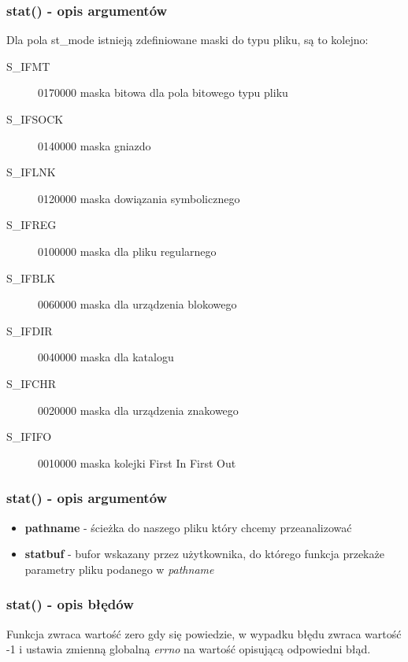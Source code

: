 \documentclass{beamer}
\begin{document}
\begin{frame}
	\frametitle{stat() - opis argumentów}
Dla pola st\_mode istnieją zdefiniowane maski do typu pliku, są to kolejno:
\begin{description}
\item[S\_IFMT]	0170000	maska bitowa dla pola bitowego typu pliku
\item[S\_IFSOCK]0140000	maska gniazdo
\item[S\_IFLNK]	0120000	maska dowiązania symbolicznego
\item[S\_IFREG]	0100000	maska dla pliku regularnego
\item[S\_IFBLK]	0060000	maska dla urządzenia blokowego
\item[S\_IFDIR]	0040000	maska dla katalogu
\item[S\_IFCHR]	0020000	maska dla urządzenia znakowego
\item[S\_IFIFO]	0010000	maska kolejki First In First Out
\end{description}
\end{frame}

\begin{frame}
	\frametitle{stat() - opis argumentów}
\begin{itemize}
\item \textbf{pathname} - ścieżka do naszego pliku który chcemy przeanalizować
\item \textbf{statbuf} - bufor wskazany przez użytkownika, do którego funkcja przekaże parametry pliku podanego w \textit{pathname}
\end{itemize}
\end{frame}

\begin{frame}
	\frametitle{stat() - opis błędów}
Funkcja zwraca wartość zero gdy się powiedzie, w wypadku błędu zwraca wartość -1 i ustawia zmienną globalną \textit{errno} na wartość opisującą odpowiedni błąd.
\end{frame}
\end{document}
